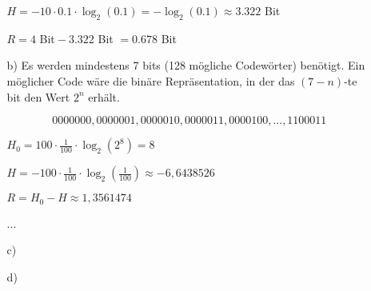 \documentclass[a4paper,10pt]{scrartcl}
\begin{document}
\begin{enumerate}
\begin{enumerate}
                $H = - 10 \cdot 0.1 \cdot \log_2(0.1) = -\log_2(0.1) \approx 3.322$ Bit

                $R = 4$ Bit${}- 3.322$ Bit $= 0.678$ Bit

            \item[b)]
                Es werden mindestens 7 bits (128 mögliche Codewörter) benötigt. Ein möglicher
                Code wäre die binäre Repräsentation, in der das $(7-n)$-te bit den Wert $2^n$
                erhält.

                $$0000000, 0000001, 0000010, 0000011, 0000100, ..., 1100011$$
				

				$H_0 = 100 \cdot \frac{1}{100} \cdot \log_2(2^8) = 8 $

                $H = - 100 \cdot \frac{1}{100} \cdot \log_2(\frac{1}{100}) \approx -6,6438526$ %
                
                $ R = H_0 - H \approx 1,3561474$
                
                ...

            \item[c)]

            \item[d)]

        \end{enumerate}
\end{enumerate}
\end{document}
